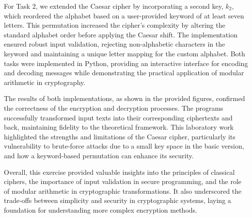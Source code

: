\documentclass[12pt]{article}
\begin{document}
For Task 2, we extended the Caesar cipher by incorporating a second key, \( k_2 \), which reordered the alphabet based on a user-provided keyword of at least seven letters. This permutation increased the cipher's complexity by altering the standard alphabet order before applying the Caesar shift. The implementation ensured robust input validation, rejecting non-alphabetic characters in the keyword and maintaining a unique letter mapping for the custom alphabet. Both tasks were implemented in Python, providing an interactive interface for encoding and decoding messages while demonstrating the practical application of modular arithmetic in cryptography.

The results of both implementations, as shown in the provided figures, confirmed the correctness of the encryption and decryption processes. The programs successfully transformed input texts into their corresponding ciphertexts and back, maintaining fidelity to the theoretical framework. This laboratory work highlighted the strengths and limitations of the Caesar cipher, particularly its vulnerability to brute-force attacks due to a small key space in the basic version, and how a keyword-based permutation can enhance its security.

Overall, this exercise provided valuable insights into the principles of classical ciphers, the importance of input validation in secure programming, and the role of modular arithmetic in cryptographic transformations. It also underscored the trade-offs between simplicity and security in cryptographic systems, laying a foundation for understanding more complex encryption methods.



\pagebreak
\end{document}
